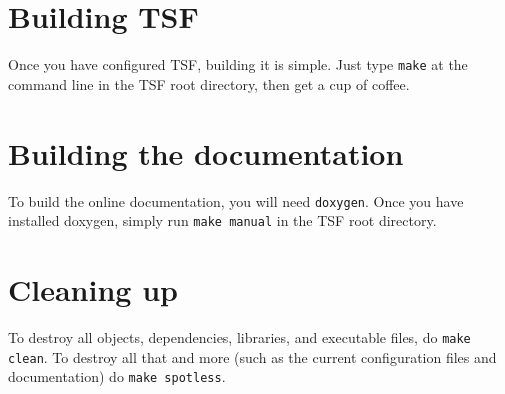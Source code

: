 \documentclass[10pt]{article}
\begin{document}
\section{Building TSF}

Once you have configured TSF, building it is simple. Just type
{\tt make} at the command line in the TSF root directory, then get a cup of coffee. 

\section{Building the documentation}

To build the online documentation, you will need {\tt doxygen}. Once you have
installed doxygen, simply run {\tt make manual} in the TSF root directory. 

\section{Cleaning up}

To destroy all objects, dependencies, libraries, and executable files, do
{\tt make clean}. To destroy all that and more (such as the current configuration files
and documentation) do {\tt make spotless}. 
\end{document}
